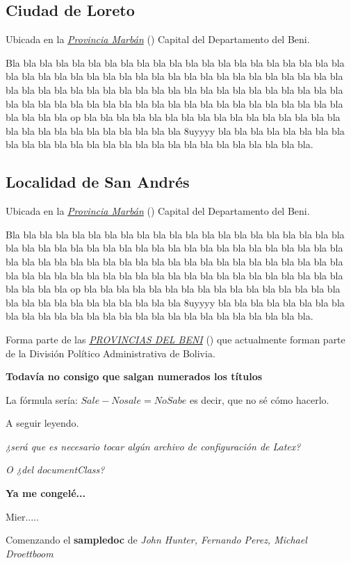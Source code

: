 \documentclass[letterpaper,10pt,english]{sphinxmanual}
\begin{document}
\subsection{Ciudad de Loreto}
\label{marban:loreto}\label{marban:ciudad-de-loreto}
Ubicada en la {\hyperref[marban:marban]{\emph{Provincia Marbán}}} () Capital del Departamento del Beni.

Bla bla bla bla bla bla bla bla bla bla bla bla bla bla bla bla bla bla bla bla bla bla bla bla bla bla bla bla bla bla bla bla bla bla
bla bla bla bla bla bla bla bla bla bla bla bla bla bla bla bla bla bla bla bla bla bla bla bla bla bla bla
bla bla bla bla bla bla bla bla bla bla bla bla bla bla bla bla bla bla bla bla bla bla bla bla bla bla bla op
bla bla bla bla bla bla bla bla bla bla bla bla bla bla bla bla bla bla bla bla bla bla bla bla bla bla bla 8uyyyy
bla bla bla bla bla bla bla bla bla bla bla bla bla bla bla bla bla bla bla bla bla bla bla bla bla bla bla.


\subsection{Localidad de San Andrés}
\label{marban:san-andres}\label{marban:localidad-de-san-andres}
Ubicada en la {\hyperref[marban:marban]{\emph{Provincia Marbán}}} () Capital del Departamento del Beni.

Bla bla bla bla bla bla bla bla bla bla bla bla bla bla bla bla bla bla bla bla bla bla bla bla bla bla bla bla bla bla bla bla bla bla
bla bla bla bla bla bla bla bla bla bla bla bla bla bla bla bla bla bla bla bla bla bla bla bla bla bla bla
bla bla bla bla bla bla bla bla bla bla bla bla bla bla bla bla bla bla bla bla bla bla bla bla bla bla bla op
bla bla bla bla bla bla bla bla bla bla bla bla bla bla bla bla bla bla bla bla bla bla bla bla bla bla bla 8uyyyy
bla bla bla bla bla bla bla bla bla bla bla bla bla bla bla bla bla bla bla bla bla bla bla bla bla bla bla.

Forma parte de las {\hyperref[provincias:provincias]{\emph{PROVINCIAS DEL BENI}}} () que actualmente forman parte de la División Político Administrativa de Bolivia.

\textbf{Todavía no consigo que salgan numerados los títulos}

La fórmula sería: \(Sale - Nosale = NoSabe\) es decir, que no sé cómo hacerlo.

A seguir leyendo.

\emph{¿será que es necesario tocar algún archivo de configuración de Latex?}

\emph{O ¿del documentClass?}

\textbf{Ya me congelé...}

Mier.....

Comenzando el \textbf{sampledoc} de \emph{John Hunter, Fernando Perez, Michael Droettboom}



\renewcommand{\indexname}{Index}
\printindex
\end{document}

